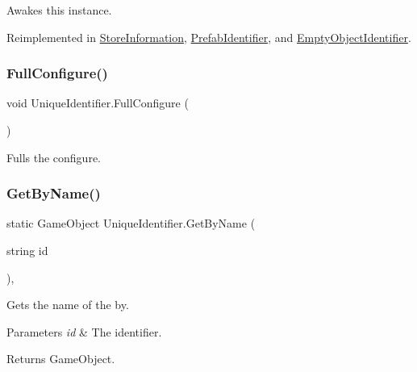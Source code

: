 Awakes this instance. 



Reimplemented in \hyperlink{class_store_information_a4a751814bad3a0171ba3aaaa19a6c8e7}{Store\+Information}, \hyperlink{class_prefab_identifier_a851c02d913a5941dfbd1a472f3b3d6f3}{Prefab\+Identifier}, and \hyperlink{class_empty_object_identifier_abb11a8f33d5c145640db3e69b6d34f10}{Empty\+Object\+Identifier}.

\mbox{\label{class_unique_identifier_a7508486be3a08da62e2cca4380a4831e}} 
\subsubsection{\texorpdfstring{Full\+Configure()}{FullConfigure()}}
{\footnotesize\ttfamily void Unique\+Identifier.\+Full\+Configure (\begin{DoxyParamCaption}{ }\end{DoxyParamCaption})\hspace{0.3cm}{\ttfamily [inline]}}



Fulls the configure. 

\mbox{\label{class_unique_identifier_ac1d6be2c8446c7cfa55fa8ceee56d6c8}} 
\subsubsection{\texorpdfstring{Get\+By\+Name()}{GetByName()}}
{\footnotesize\ttfamily static Game\+Object Unique\+Identifier.\+Get\+By\+Name (\begin{DoxyParamCaption}\item[{string}]{id }\end{DoxyParamCaption})\hspace{0.3cm}{\ttfamily [inline]}, {\ttfamily [static]}}



Gets the name of the by. 


\begin{DoxyParams}{Parameters}
{\em id} & The identifier.\\
\hline
\end{DoxyParams}
\begin{DoxyReturn}{Returns}
Game\+Object.
\end{DoxyReturn}


